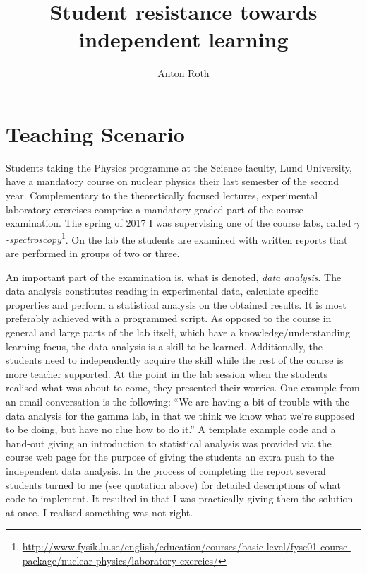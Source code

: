 \documentclass[]{article}
\title{Student resistance towards independent learning}
\author{Anton Roth}
\begin{document}

\section*{Teaching Scenario}
Students taking the Physics programme at the Science faculty, Lund University, have a mandatory course on nuclear physics their last semester of the second year.
Complementary to the theoretically focused lectures, experimental laboratory exercises comprise a mandatory graded part of the course examination.
The spring of 2017 I was supervising one of the course labs, called {\it $\gamma$-spectroscopy}\footnote{\url{http://www.fysik.lu.se/english/education/courses/basic-level/fysc01-course-package/nuclear-physics/laboratory-exercies/}}.
On the lab the students are examined with written reports that are performed in groups of two or three.

An important part of the examination is, what is denoted, {\it data analysis}.
The data analysis constitutes reading in experimental data, calculate specific properties and perform a statistical analysis on the obtained results.
It is most preferably achieved with a programmed script.
As opposed to the course in general and large parts of the lab itself, which have a knowledge/understanding learning focus, the data analysis is a skill to be learned.
Additionally, the students need to independently acquire the skill while the rest of the course is more teacher supported.
At the point in the lab session when the students realised what was about to come, they presented their worries.
One example from an email conversation is the following: ``We are having a bit of trouble with the data analysis for the gamma lab, in that we think we know what we're supposed to be doing, but have no clue how to do it.''
A template example code and a hand-out giving an introduction to statistical analysis was provided via the course web page for the purpose of giving the students an extra push to the independent data analysis.
In the process of completing the report several students turned to me (see quotation above) for detailed descriptions of what code to implement.
It resulted in that I was practically giving them the solution at once.
I realised something was not right.
\end{document}
